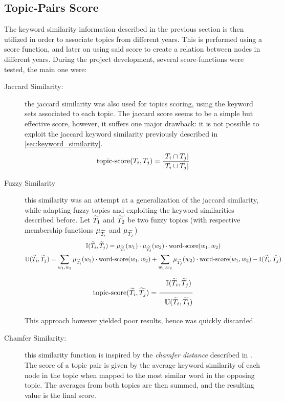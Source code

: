 \subsection{Topic-Pairs Score}\label{sec:topic_score}
The keyword similarity information described in the previous section is then utilized in order to associate topics from different years. This is performed using a score function, and later on using said score to create a relation between nodes in different years. 
During the project development, several score-functions were tested, the main one were:
\begin{description}
	\item[Jaccard Similarity:] the jaccard similarity was also used for topics scoring, using the keyword sets associated to each topic. The jaccard score seems to be a simple but effective score, however, it suffers one major drawback: it is not possible to exploit the jaccard keyword similarity previously described in \cref{sec:keyword_similarity}. %
	$$\mathop{\mathrm{topic\text{-}score}}(T_i,T_j) = \frac{|T_i\cap T_j|}{|T_i \cup T_j|}$$
	\item[Fuzzy Similarity] this similarity was an attempt at a generalization of the  jaccard similarity, while adapting fuzzy topics and exploiting the keyword similarities described before.
	Let $\widetilde{T_1}$ and $\widetilde{T_2}$ be two fuzzy topics (with respective membership functions $\mu_{\widetilde{T_i}}$ and $\mu_{\widetilde{T_j}}$)
	\begin{gather*}
		\mathbb I(\widetilde{T}_i,\widetilde{T}_j) = \mathop{\mu_{\widetilde{T_i}}}(w_1)\cdot \mathop{\mu_{\widetilde{T_j}}}(w_2)\cdot \mathop{\mathrm{word\text{-}score}}(w_1,w_2)\\
		\mathbb U(\widetilde{T}_i,\widetilde{T}_j) = \sum_{w_1,w_2}\mathop{\mu_{\widetilde{T_i}}}(w_1)\cdot \mathop{\mathrm{word\text{-}score}}(w_1,w_2) +  \sum_{w_1,w_2}\mathop{\mu_{\widetilde{T_j}}}(w_2)\cdot \mathop{\mathrm{word\text{-}score}}(w_1,w_2) - \mathbb I(\widetilde{T}_i,\widetilde{T}_j)
	\end{gather*}
	$$
	\mathop{\mathrm{topic\text{-}score}}(\widetilde{T_i}, \widetilde{T_j}) = \frac{\displaystyle\phantom{\bigg(}\mathbb I(\widetilde{T}_i,\widetilde{T}_j)}{\displaystyle \phantom{\bigg(} \mathbb U(\widetilde{T}_i,\widetilde{T}_j)}
	$$
	This approach however yielded poor results, hence was quickly discarded.
	\item[Chamfer Similarity:] this similarity function is inspired by the \textit{chamfer distance} described in \cite{chamfer}. The score of a topic pair is given by the average keyword similarity of each node in the topic when mapped to the most similar word in the opposing topic. The averages from both topics are then summed, and the resulting value is the final score.

\end{description}
